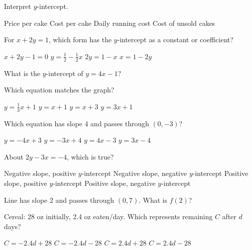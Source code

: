 \documentclass[12pt]{exam}
\begin{document}
\begin{questions}
\question Interpret $y$-intercept.
\begin{choices}
\choice Price per cake
\choice Cost per cake
\choice Daily running cost
\choice Cost of unsold cakes
\end{choices}

\question For $x + 2y = 1$, which form has the $y$-intercept as a constant or coefficient?
\begin{choices}
\choice $x + 2y - 1 = 0$
\choice $y = \frac{1}{2} - \frac{1}{2}x$
\choice $2y = 1 - x$
\choice $x = 1 - 2y$
\end{choices}

\question What is the $y$-intercept of $y = 4x - 1$?

\question Which equation matches the graph?
\begin{center}
\end{center}
\begin{choices}
\choice $y = \frac{1}{3}x + 1$
\choice $y = x + 1$
\choice $y = x + 3$
\choice $y = 3x + 1$
\end{choices}

\question Which equation has slope 4 and passes through $(0,-3)$?
\begin{choices}
\choice $y = -4x + 3$
\choice $y = -3x + 4$
\choice $y = 4x - 3$
\choice $y = 3x - 4$
\end{choices}

\question About $2y - 3x = -4$, which is true?
\begin{choices}
\choice Negative slope, positive $y$-intercept
\choice Negative slope, negative $y$-intercept
\choice Positive slope, positive $y$-intercept
\choice Positive slope, negative $y$-intercept
\end{choices}

\question Line has slope 2 and passes through $(0,7)$. What is $f(2)$?
\begin{choices}
\end{choices}

\question Cereal: 28 oz initially, 2.4 oz eaten/day. Which represents remaining $C$ after $d$ days?
\begin{choices}
\choice $C = -2.4d + 28$
\choice $C = -2.4d - 28$
\choice $C = 2.4d + 28$
\choice $C = 2.4d - 28$
\end{choices}


\end{questions}
\end{document}
